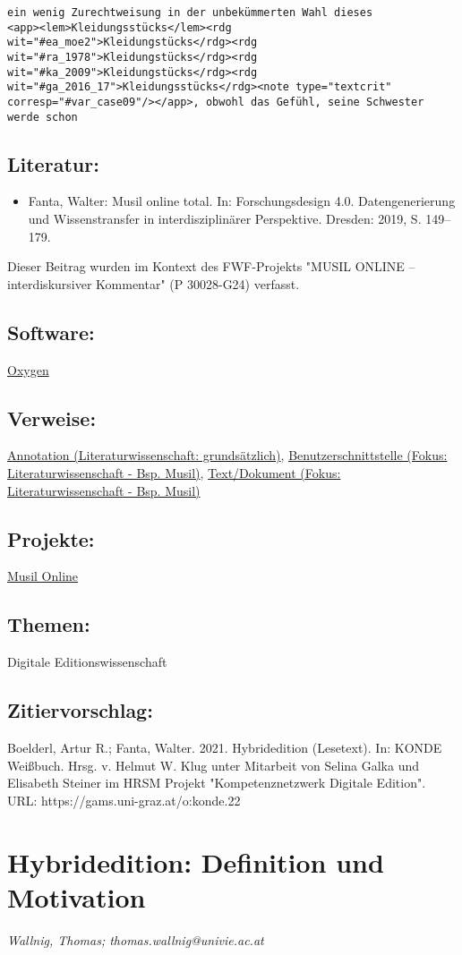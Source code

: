 \documentclass{article}
\begin{document}
        \begin{verbatim}ein wenig Zurechtweisung in der unbekümmerten Wahl dieses
<app><lem>Kleidungsstücks</lem><rdg
wit="#ea_moe2">Kleidungstücks</rdg><rdg
wit="#ra_1978">Kleidungstücks</rdg><rdg
wit="#ka_2009">Kleidungstücks</rdg><rdg
wit="#ga_2016_17">Kleidungsstücks</rdg><note type="textcrit"
corresp="#var_case09"/></app>, obwohl das Gefühl, seine Schwester
werde schon\end{verbatim}\subsection*{Literatur:}\begin{itemize}\item Fanta, Walter: Musil online total. In: Forschungsdesign 4.0. Datengenerierung und
                              Wissenstransfer in interdisziplinärer Perspektive. Dresden: 2019, S. 149–179.\end{itemize}Dieser Beitrag wurden im Kontext des FWF-Projekts "MUSIL ONLINE – interdiskursiver Kommentar" 
                  (P 30028-G24) verfasst.\subsection*{Software:}\href{http://oxygenxml.com/}{Oxygen}\subsection*{Verweise:}\href{https://gams.uni-graz.at/o:konde.17}{Annotation (Literaturwissenschaft:
                           grundsätzlich)}, \href{https://gams.uni-graz.at/o:konde.18}{Benutzerschnittstelle (Fokus:
                           Literaturwissenschaft - Bsp. Musil)}, \href{https://gams.uni-graz.at/o:konde.27}{Text/Dokument (Fokus:
                           Literaturwissenschaft - Bsp. Musil)}\subsection*{Projekte:}\href{http://musilonline.at}{Musil Online}\subsection*{Themen:}Digitale Editionswissenschaft\subsection*{Zitiervorschlag:}Boelderl, Artur R.; Fanta, Walter. 2021. Hybridedition (Lesetext). In: KONDE Weißbuch. Hrsg. v. Helmut W. Klug unter Mitarbeit von Selina Galka und Elisabeth Steiner im HRSM Projekt "Kompetenznetzwerk Digitale Edition". URL: https://gams.uni-graz.at/o:konde.22\newpage\section*{Hybridedition: Definition und Motivation} \emph{Wallnig, Thomas; thomas.wallnig@univie.ac.at }\\
        
\end{document}
